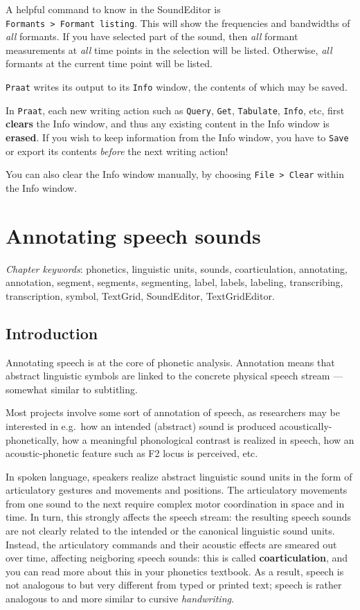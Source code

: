 \documentclass[
]{book}
\begin{document}
A helpful command to know in the SoundEditor is \texttt{Formants\ \textgreater{}\ Formant\ listing}. This will show the frequencies and bandwidths of \emph{all} formants. If you have selected part of the sound, then \emph{all} formant measurements at \emph{all} time points in the selection will be listed. Otherwise, \emph{all} formants at the current time point will be listed.

\texttt{Praat} writes its output to its \texttt{Info} window, the contents of which may be saved.

\label{box:clearinfo}
In \texttt{Praat}, each new writing action such as \texttt{Query}, \texttt{Get}, \texttt{Tabulate}, \texttt{Info}, etc, first \textbf{clears} the Info window, and thus any existing content in the Info window is \textbf{erased}. If you wish to keep information from the Info window, you have to \texttt{Save} or export its contents \emph{before} the next writing action!

You can also clear the Info window manually, by choosing \texttt{File\ \textgreater{}\ Clear} within the Info window.

\chapter{Annotating speech sounds}\label{ch-annotation}

\emph{Chapter keywords}: phonetics, linguistic units, sounds, coarticulation, annotating, annotation, segment, segments, segmenting, label, labels, labeling, transcribing, transcription, symbol, TextGrid, SoundEditor, TextGridEditor.

\section{Introduction}\label{sec:coarticulation-intro}

Annotating speech is at the core of phonetic analysis. Annotation means that abstract linguistic symbols are linked to the concrete physical speech stream --- somewhat similar to subtitling.

Most projects involve some sort of annotation of speech, as researchers may be interested in e.g.~how an intended (abstract) sound is produced acoustically-phonetically, how a meaningful phonological contrast is realized in speech, how an acoustic-phonetic feature such as F2 locus is perceived, etc.

In spoken language, speakers realize abstract linguistic sound units in the form of articulatory gestures and movements and positions. The articulatory movements from one sound to the next require complex motor coordination in space and in time. In turn, this strongly affects the speech stream: the resulting speech sounds are not clearly related to the intended or the canonical linguistic sound units. Instead, the articulatory commands and their acoustic effects are smeared out over time, affecting neigboring speech sounds: this is called \textbf{coarticulation}, and you can read more about this in your phonetics textbook. As a result, speech is not analogous to but very different from typed or printed text; speech is rather analogous to and more similar to cursive \emph{handwriting}.
\end{document}
